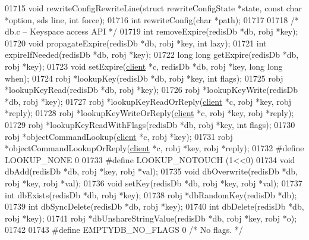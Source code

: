 \begin{DoxyCode}
{{{{{{{01715 \textcolor{keywordtype}{void} rewriteConfigRewriteLine(\textcolor{keyword}{struct} rewriteConfigState *state, \textcolor{keyword}{const} \textcolor{keywordtype}{char} *option, sds line, \textcolor{keywordtype}{int} 
      force);
01716 \textcolor{keywordtype}{int} rewriteConfig(\textcolor{keywordtype}{char} *path);
01717 
01718 \textcolor{comment}{/* db.c -- Keyspace access API */}
01719 \textcolor{keywordtype}{int} removeExpire(redisDb *db, robj *key);
01720 \textcolor{keywordtype}{void} propagateExpire(redisDb *db, robj *key, \textcolor{keywordtype}{int} lazy);
01721 \textcolor{keywordtype}{int} expireIfNeeded(redisDb *db, robj *key);
01722 \textcolor{keywordtype}{long} \textcolor{keywordtype}{long} getExpire(redisDb *db, robj *key);
01723 \textcolor{keywordtype}{void} setExpire(\hyperlink{structclient}{client} *c, redisDb *db, robj *key, \textcolor{keywordtype}{long} \textcolor{keywordtype}{long} when);
01724 robj *lookupKey(redisDb *db, robj *key, \textcolor{keywordtype}{int} flags);
01725 robj *lookupKeyRead(redisDb *db, robj *key);
01726 robj *lookupKeyWrite(redisDb *db, robj *key);
01727 robj *lookupKeyReadOrReply(\hyperlink{structclient}{client} *c, robj *key, robj *reply);
01728 robj *lookupKeyWriteOrReply(\hyperlink{structclient}{client} *c, robj *key, robj *reply);
01729 robj *lookupKeyReadWithFlags(redisDb *db, robj *key, \textcolor{keywordtype}{int} flags);
01730 robj *objectCommandLookup(\hyperlink{structclient}{client} *c, robj *key);
01731 robj *objectCommandLookupOrReply(\hyperlink{structclient}{client} *c, robj *key, robj *reply);
01732 \textcolor{preprocessor}{#}\textcolor{preprocessor}{define} \textcolor{preprocessor}{LOOKUP\_NONE} 0
01733 \textcolor{preprocessor}{#}\textcolor{preprocessor}{define} \textcolor{preprocessor}{LOOKUP\_NOTOUCH} \textcolor{preprocessor}{(}1\textcolor{preprocessor}{<<}0\textcolor{preprocessor}{)}
01734 \textcolor{keywordtype}{void} dbAdd(redisDb *db, robj *key, robj *val);
01735 \textcolor{keywordtype}{void} dbOverwrite(redisDb *db, robj *key, robj *val);
01736 \textcolor{keywordtype}{void} setKey(redisDb *db, robj *key, robj *val);
01737 \textcolor{keywordtype}{int} dbExists(redisDb *db, robj *key);
01738 robj *dbRandomKey(redisDb *db);
01739 \textcolor{keywordtype}{int} dbSyncDelete(redisDb *db, robj *key);
01740 \textcolor{keywordtype}{int} dbDelete(redisDb *db, robj *key);
01741 robj *dbUnshareStringValue(redisDb *db, robj *key, robj *o);
01742 
01743 \textcolor{preprocessor}{#}\textcolor{preprocessor}{define} \textcolor{preprocessor}{EMPTYDB\_NO\_FLAGS} 0      \textcolor{comment}{/* No flags. */}
}}}}}}}
\end{DoxyCode}
